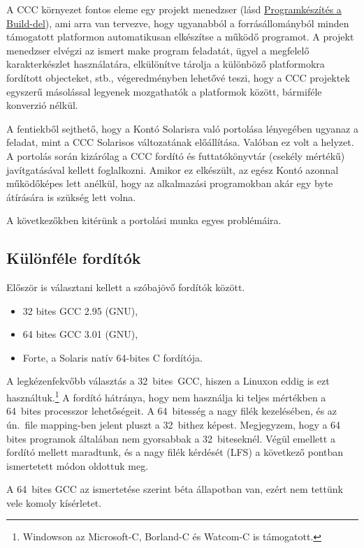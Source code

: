 A CCC környezet fontos eleme egy projekt menedzser
(lásd \href{http://www.comfirm.hu/ccc2/build.html}{Programkészítés a Build-del}), 
ami arra van tervezve, hogy ugyanabból a forrásállományból minden támogatott 
platformon automatikusan elkészítse a működő programot. A projekt menedzser 
elvégzi az ismert make program feladatát, ügyel a megfelelő 
karakterkészlet használatára, elkülönítve tárolja a különböző 
platformokra fordított objecteket, stb., végeredményben lehetővé teszi,
hogy a CCC projektek egyszerű másolással legyenek mozgathatók
a platformok között, bármiféle konverzió nélkül.

A fentiekből sejthető, hogy a Kontó Solarisra való portolása
lényegében ugyanaz a feladat, mint a CCC Solarisos változatának
előállítása. Valóban ez volt a helyzet. A portolás során kizárólag
a CCC fordító és futtatókönyvtár (csekély mértékű) javítgatásával
kellett foglalkozni. Amikor ez elkészült, az egész Kontó azonnal működőképes
lett anélkül, hogy az alkalmazási programokban akár egy byte
átírására is szükség lett volna. 

A következőkben kitérünk a portolási munka egyes problémáira.

\subsection{Különféle fordítók}

Először is választani kellett a szóbajövő fordítók között.
\begin{itemize}
 \item 32 bites GCC 2.95 (GNU),
 \item 64 bites GCC 3.01 (GNU), 
 \item Forte, a Solaris natív 64-bites C fordítója.
\end{itemize}

A legkézenfekvőbb választás a 32~bites~GCC, hiszen a Linuxon eddig is
ezt használtuk.\footnote{Windowson az Microsoft-C, Borland-C és Watcom-C is
támogatott.}  A fordító hátránya, hogy nem használja ki teljes 
mértékben a 64~bites processzor lehetőségeit. A 64~bitesség 
a nagy filék kezelésében, és az ún.\ file mapping-ben jelent pluszt
a 32~bithez képest. Megjegyzem, hogy a 64 bites programok általában
nem gyorsabbak a 32~biteseknél. Végül emellett a fordító mellett
maradtunk, és a nagy filék kérdését (LFS) a következő pontban ismertetett
módon oldottuk meg.

A 64~bites GCC az ismertetése szerint béta állapotban van, 
ezért nem tettünk vele komoly kísérletet.

